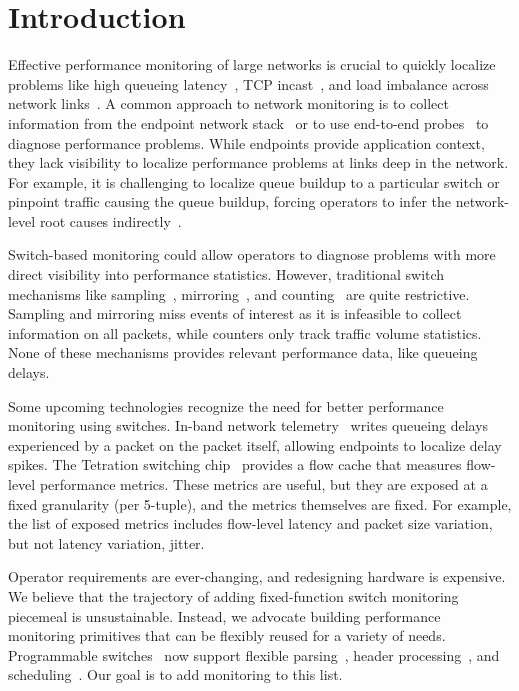 \section{Introduction}
\label{sec:intro}

Effective performance monitoring of large networks is crucial to quickly
localize problems like high queueing latency~\cite{int}, TCP
incast~\cite{tcpincast}, and load imbalance across network links~\cite{conga}.
A common approach to network monitoring is to collect information from the
endpoint network stack~\cite{minlan-snap, pathdump, trumpet} or
to use end-to-end probes~\cite{pingmesh} to diagnose performance problems.  While
endpoints provide application context, they lack visibility to localize
performance problems at links deep in the network. For example, it is
challenging to localize queue buildup to a particular switch or pinpoint
traffic causing the queue buildup, forcing operators to infer the network-level
root causes indirectly~\cite{pingmesh}.

Switch-based monitoring could allow operators to diagnose problems with more
direct visibility into performance statistics. However, traditional switch
mechanisms like sampling~\cite{netflow, sflow}, mirroring~\cite{cisco-span,
netsight, everflow}, and counting~\cite{cormode, univmon} are quite restrictive.  Sampling
and mirroring miss events of interest as it is infeasible to collect
information on all packets, while counters only track traffic volume
statistics. None of these mechanisms provides relevant performance data, like
queueing delays.

Some upcoming technologies recognize the need for better performance monitoring
using switches. In-band network telemetry~\cite{int} writes queueing delays
experienced by a packet on the packet itself, allowing endpoints to localize
delay spikes. The Tetration switching chip~\cite{tetration-telemetry} provides
a flow cache that measures flow-level performance metrics.  These metrics are
useful, but they are exposed at a fixed granularity (\eg per 5-tuple), and the metrics themselves
are fixed. For example, the list of exposed metrics includes flow-level latency
and packet size variation, but not latency variation, \ie jitter.

Operator requirements are ever-changing, and redesigning hardware is expensive.
We believe that the trajectory of adding fixed-function switch monitoring
piecemeal is unsustainable. Instead, we advocate building performance
monitoring primitives that can be flexibly reused for a variety of
needs. Programmable switches~\cite{flexpipe, tofino, xpliant} now support flexible
parsing~\cite{gibb_parsing}, header processing~\cite{rmt, domino_sigcomm}, and
scheduling~\cite{pifo_sigcomm}. Our goal is to add monitoring to this list.

